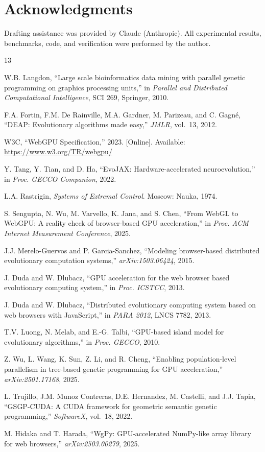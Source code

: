 \documentclass[sigconf,nonacm]{acmart}
\begin{document}
\section*{Acknowledgments}

Drafting assistance was provided by Claude (Anthropic). All experimental results, benchmarks, code, and verification were performed by the author.


\begin{thebibliography}{13}

W.B. Langdon, ``Large scale bioinformatics data mining with parallel genetic programming on graphics processing units,'' in \emph{Parallel and Distributed Computational Intelligence}, SCI 269, Springer, 2010.

F.A. Fortin, F.M. De Rainville, M.A. Gardner, M. Parizeau, and C. Gagn\'{e}, ``DEAP: Evolutionary algorithms made easy,'' \emph{JMLR}, vol.~13, 2012.

W3C, ``WebGPU Specification,'' 2023. [Online]. Available: \url{https://www.w3.org/TR/webgpu/}

Y. Tang, Y. Tian, and D. Ha, ``EvoJAX: Hardware-accelerated neuroevolution,'' in \emph{Proc. GECCO Companion}, 2022.

L.A. Rastrigin, \emph{Systems of Extremal Control}. Moscow: Nauka, 1974.

S. Sengupta, N. Wu, M. Varvello, K. Jana, and S. Chen, ``From WebGL to WebGPU: A reality check of browser-based GPU acceleration,'' in \emph{Proc. ACM Internet Measurement Conference}, 2025.

J.J. Merelo-Guervos and P. Garcia-Sanchez, ``Modeling browser-based distributed evolutionary computation systems,'' \emph{arXiv:1503.06424}, 2015.

J. Duda and W. Dlubacz, ``GPU acceleration for the web browser based evolutionary computing system,'' in \emph{Proc. ICSTCC}, 2013.

J. Duda and W. Dlubacz, ``Distributed evolutionary computing system based on web browsers with JavaScript,'' in \emph{PARA 2012}, LNCS 7782, 2013.

T.V. Luong, N. Melab, and E.-G. Talbi, ``GPU-based island model for evolutionary algorithms,'' in \emph{Proc. GECCO}, 2010.

Z. Wu, L. Wang, K. Sun, Z. Li, and R. Cheng, ``Enabling population-level parallelism in tree-based genetic programming for GPU acceleration,'' \emph{arXiv:2501.17168}, 2025.

L. Trujillo, J.M. Munoz Contreras, D.E. Hernandez, M. Castelli, and J.J. Tapia, ``GSGP-CUDA: A CUDA framework for geometric semantic genetic programming,'' \emph{SoftwareX}, vol.~18, 2022.

M. Hidaka and T. Harada, ``WgPy: GPU-accelerated NumPy-like array library for web browsers,'' \emph{arXiv:2503.00279}, 2025.

\end{thebibliography}
\end{document}
